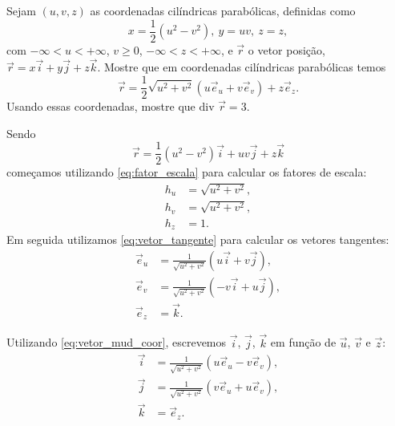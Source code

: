 \documentclass[a4paper,12pt, leqno, answers]{exam}
\begin{document}
\begin{questions}
    \question Sejam $(u, v, z)$ as coordenadas cil\'{i}ndricas parab\'{o}licas, definidas como
    \[
    x = \frac{1}{2} (u^2 - v^2), \ y = uv, \ z = z,
    \]
    com $-\infty < u < +\infty$, $v \geq 0$, $-\infty < z < +\infty$, e $\vec{r}$ o vetor posi\c{c}\~{a}o, $\vec{r} = x \vec{i} + y \vec{j} + z \vec{k}$. Mostre que em coordenadas cil\'{i}ndricas parab\'{o}licas temos
    \[
    \vec{r} = \frac{1}{2} \sqrt{u^2 + v^2} (u \vec{e}_u + v \vec{e}_v) + z \vec{e}_z.
    \]
    Usando essas coordenadas, mostre que $\mbox{div } \vec{r} = 3$.
    \begin{solution}
        Sendo
        \[
        \vec{r} = \frac{1}{2} \left(u^2 - v^2\right) \vec{i} + u v \vec{j} + z \vec{k}
        \]
        come\c{c}amos utilizando \eqref{eq:fator_escala} para calcular os fatores de escala:
        \begin{align*}
            h_u &= \sqrt{u^2 + v^2}, \\
            h_v &= \sqrt{u^2 + v^2}, \\
            h_z &= 1.
        \end{align*}
        Em seguida utilizamos \eqref{eq:vetor_tangente} para calcular os vetores tangentes:
        \begin{align*}
            \vec{e}_u &= \frac{1}{\sqrt{u^2 + v^2}} \left(u \vec{i} + v \vec{j}\right), \\
            \vec{e}_v &= \frac{1}{\sqrt{u^2 + v^2}} \left(-v \vec{i} + u \vec{j}\right), \\
            \vec{e}_z &= \vec{k}.
        \end{align*}
  
        Utilizando \eqref{eq:vetor_mud_coor}, escrevemos $\vec{i}$, $\vec{j}$, $\vec{k}$ em fun\c{c}\~{a}o de $\vec{u}$, $\vec{v}$ e $\vec{z}$:
        \begin{align*}
            \vec{i} &= \frac{1}{\sqrt{u^2 + v^2}} \left(u \vec{e}_u - v \vec{e}_v\right), \\
            \vec{j} &= \frac{1}{\sqrt{u^2 + v^2}} \left(v \vec{e}_u + u \vec{e}_v\right), \\
            \vec{k} &= \vec{e}_z.
        \end{align*}
  

\end{solution}
\end{questions}
\end{document}
